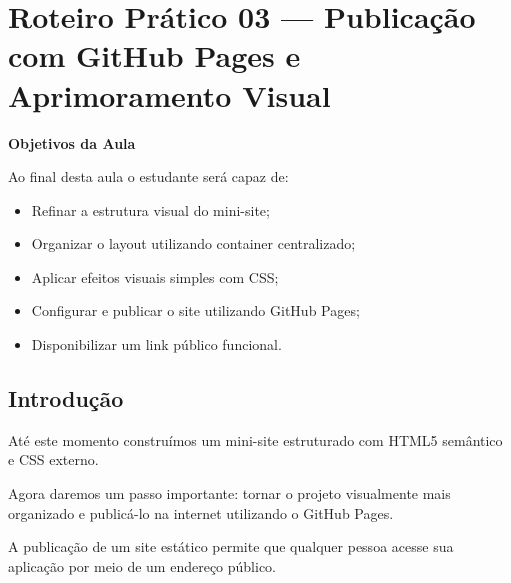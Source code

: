 \documentclass[12pt,a4paper]{article}
\begin{document}
\newpage









\section{Roteiro Prático 03 — Publicação com GitHub Pages e Aprimoramento Visual}

    
    \begin{boxObjetivos}
    \textbf{Objetivos da Aula}
    
    Ao final desta aula o estudante será capaz de:
    
    \begin{itemize}
    \item Refinar a estrutura visual do mini-site;
    \item Organizar o layout utilizando container centralizado;
    \item Aplicar efeitos visuais simples com CSS;
    \item Configurar e publicar o site utilizando GitHub Pages;
    \item Disponibilizar um link público funcional.
    \end{itemize}
    \end{boxObjetivos}

    
    \subsection*{Introdução}
    
    Até este momento construímos um mini-site estruturado com HTML5 semântico e CSS externo.
    
    Agora daremos um passo importante: tornar o projeto visualmente mais organizado e publicá-lo na internet utilizando o GitHub Pages.
    
    A publicação de um site estático permite que qualquer pessoa acesse sua aplicação por meio de um endereço público.
    
\end{document}
